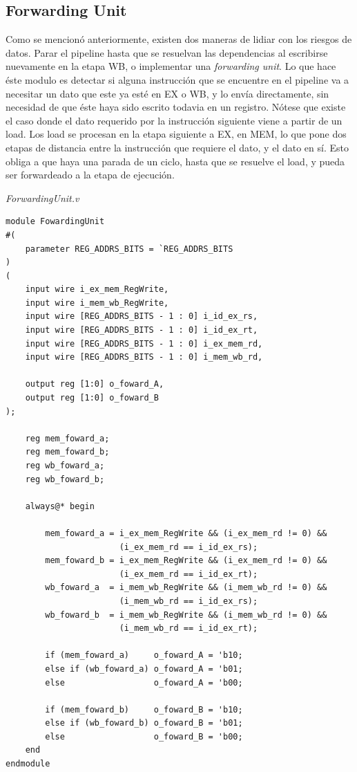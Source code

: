 \documentclass[12pt]{article}
\begin{document}
\subsection{Forwarding Unit}

Como se mencionó anteriormente, existen dos maneras de lidiar con los riesgos de datos. Parar el pipeline hasta que se resuelvan las dependencias al escribirse nuevamente en la etapa WB, o implementar una \textit{forwarding unit}. Lo que hace éste modulo es detectar si alguna instrucción que se encuentre en el pipeline va a necesitar un dato que este ya esté en EX o WB, y lo envía directamente, sin necesidad de que éste haya sido escrito todavia en un registro. Nótese que existe el caso donde el dato requerido por la instrucción siguiente viene a partir de un load. Los load se procesan en la etapa siguiente a EX, en MEM, lo que pone dos etapas de distancia entre la instrucción que requiere el dato, y el dato en sí. Esto obliga a que haya una parada de un ciclo, hasta que se resuelve el load, y pueda ser forwardeado a la etapa de ejecución.

\noindent \textit{ForwardingUnit.v}
\begin{lstlisting}
module FowardingUnit
#(
    parameter REG_ADDRS_BITS = `REG_ADDRS_BITS
)
(
    input wire i_ex_mem_RegWrite,
    input wire i_mem_wb_RegWrite,
    input wire [REG_ADDRS_BITS - 1 : 0] i_id_ex_rs,
    input wire [REG_ADDRS_BITS - 1 : 0] i_id_ex_rt,
    input wire [REG_ADDRS_BITS - 1 : 0] i_ex_mem_rd,
    input wire [REG_ADDRS_BITS - 1 : 0] i_mem_wb_rd,

    output reg [1:0] o_foward_A,
    output reg [1:0] o_foward_B
);

    reg mem_foward_a;
    reg mem_foward_b;
    reg wb_foward_a;
    reg wb_foward_b;

    always@* begin

        mem_foward_a = i_ex_mem_RegWrite && (i_ex_mem_rd != 0) &&
                       (i_ex_mem_rd == i_id_ex_rs);
        mem_foward_b = i_ex_mem_RegWrite && (i_ex_mem_rd != 0) &&
                       (i_ex_mem_rd == i_id_ex_rt);
        wb_foward_a  = i_mem_wb_RegWrite && (i_mem_wb_rd != 0) &&
                       (i_mem_wb_rd == i_id_ex_rs);
        wb_foward_b  = i_mem_wb_RegWrite && (i_mem_wb_rd != 0) &&
                       (i_mem_wb_rd == i_id_ex_rt);

        if (mem_foward_a)     o_foward_A = 'b10;
        else if (wb_foward_a) o_foward_A = 'b01;
        else                  o_foward_A = 'b00;

        if (mem_foward_b)     o_foward_B = 'b10;
        else if (wb_foward_b) o_foward_B = 'b01;
        else                  o_foward_B = 'b00;
    end
endmodule
\end{lstlisting}
\end{document}
